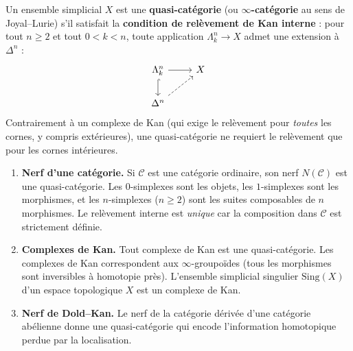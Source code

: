 \begin{definition}\label{def:quasi-categorie}
Un ensemble simplicial $X$ est une \textbf{quasi-catégorie}
(ou \textbf{$\infty$-catégorie} au sens de Joyal--Lurie) s'il
satisfait la \textbf{condition de relèvement de Kan interne} :
pour tout $n \geq 2$ et tout $0 < k < n$, toute application
$\Lambda^n_k \to X$ admet une extension à $\Delta^n$ :
\[
\begin{tikzcd}
\Lambda^n_k \arrow[r] \arrow[d, hook] & X \\
\Delta^n \arrow[ur, dashed] &
\end{tikzcd}
\]
Contrairement à un complexe de Kan (qui exige le relèvement pour
\emph{toutes} les cornes, y compris extérieures), une quasi-catégorie
ne requiert le relèvement que pour les cornes intérieures.
\end{definition}

\begin{exemple}\label{ex:quasi-categories}
\begin{enumerate}[label=(\roman*)]
\item \textbf{Nerf d'une catégorie.}
      Si $\mathcal{C}$ est une catégorie ordinaire, son nerf
      $N(\mathcal{C})$ est une quasi-catégorie.
      Les $0$-simplexes sont les objets, les $1$-simplexes sont les
      morphismes, et les $n$-simplexes ($n \geq 2$) sont les suites
      composables de $n$ morphismes.
      Le relèvement interne est \emph{unique} car la composition dans
      $\mathcal{C}$ est strictement définie.

\item \textbf{Complexes de Kan.}
      Tout complexe de Kan est une quasi-catégorie.
      Les complexes de Kan correspondent aux $\infty$-groupoïdes
      (tous les morphismes sont inversibles à homotopie près).
      L'ensemble simplicial singulier $\mathrm{Sing}(X)$ d'un espace
      topologique $X$ est un complexe de Kan.

\item \textbf{Nerf de Dold--Kan.}
      Le nerf de la catégorie dérivée d'une catégorie abélienne
      donne une quasi-catégorie qui encode l'information homotopique
      perdue par la localisation.
\end{enumerate}
\end{exemple}

